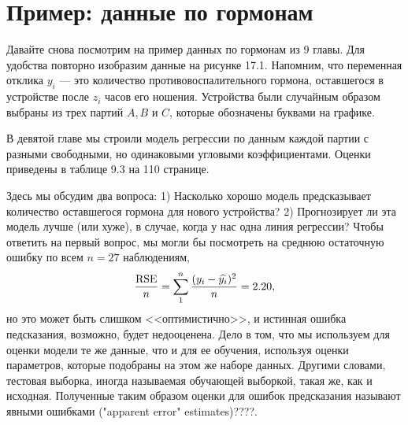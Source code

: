 
\section{Пример: данные по гормонам}
Давайте снова посмотрим на пример данных по гормонам из 9 главы. Для удобства повторно изобразим данные на рисунке 17.1. Напомним, что переменная отклика $y_{i}$ --- это количество противовоспалительного гормона, оставшегося в устройстве после $z_{i}$ часов его ношения. Устройства были случайным образом выбраны из трех партий $A, B$ и $C$, которые обозначены буквами на графике.
\begin{figure}[h]
\end{figure}
В девятой главе мы строили модель регрессии по данным каждой партии с разными свободными, но одинаковыми угловыми коэффициентами. Оценки приведены в таблице 9.3 на 110 странице.

Здесь мы обсудим два вопроса: 1) Насколько хорошо модель предсказывает количество оставшегося гормона для нового устройства? 2) Прогнозирует ли эта модель лучше (или хуже), в случае, когда у нас одна линия регрессии? Чтобы ответить на первый вопрос, мы могли бы посмотреть на среднюю остаточную ошибку по всем $n = 27$ наблюдениям,
\begin{equation}
\frac{\text{RSE}}{n} = \sum_{1}^{n} \frac{(y_{i} - \widehat{y_{i}})^{2}}{n} = 2.20,
\end{equation}
но это может быть слишком <<оптимистично>>, и истинная ошибка педсказания, возможно, будет недооценена. Дело в том, что мы используем для оценки модели те же данные, что и для ее обучения, используя оценки параметров, которые подобраны на этом же наборе данных. Другими словами, тестовая выборка, иногда называемая обучающей выборкой, такая же, как и исходная. Полученные таким образом оценки для ошибок предсказания называют явными ошибками ("apparent error" estimates)????.

